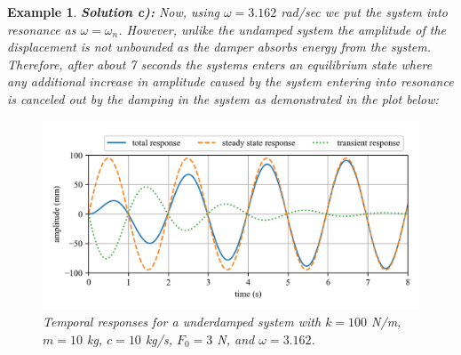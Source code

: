 \documentclass[12pt,letter]{article}
\newtheorem{ex}{Example}
\numberwithin{ex}{section} %
\newenvironment{example}{\begin{mdframed}[middlelinewidth=0.5mm]\begin{ex}\normalfont}{\end{ex}\end{mdframed}}
\numberwithin{re}{section} %
\begin{document}
\begin{example}
				\noindent\textbf{Solution c):} Now, using $\omega=3.162$ rad/sec we put the system into resonance as $\omega=\omega_n$. However, unlike the undamped system  the amplitude of the displacement is not unbounded as the damper absorbs energy from the system. Therefore, after about 7 seconds the systems enters an equilibrium state where any additional increase in amplitude caused by the system entering into resonance is canceled out by the damping in the system as demonstrated in the plot below:
				\begin{figure}[H]
					\centering
					\includegraphics[]{../Figures/homogeneous_and_particular_solutions_in_resonance_c.png}
					\caption{Temporal responses for a underdamped system with $k=100$ N/m, $m=10$ kg,  $c=10$ kg/s, $F_0=3$ N, and $\omega = 3.162$.}
				\end{figure}				
			\end{example}	
\end{document}
